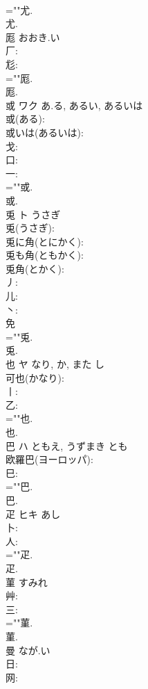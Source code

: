\documentclass[8pt]{extreport}
\begin{document}
\begin{CJK}{UTF8}{min}
\\	=""尤.
\\	尤.
\\	厖		おおき.い				
\\	厂: 
\\	尨: 
\\	=""厖.
\\	厖.
\\	或	ワク	あ.る, あるい, あるいは		
\\	或(ある): 
\\	或いは(あるいは): 
\\	戈: 
\\	口: 
\\	一: 
\\	=""或.
\\	或.
\\	兎	ト	うさぎ		
\\	兎(うさぎ): 
\\	兎に角(とにかく): 
\\	兎も角(ともかく): 
\\	兎角(とかく): 
\\	丿: 
\\	儿: 
\\	丶: 
\\	免 
\\	=""兎.
\\	兎.
\\	也	ヤ	なり, か, また	し	
\\	可也(かなり): 
\\	丨: 
\\	乙: 
\\	=""也.
\\	也.
\\	巴	ハ	ともえ, うずまき	とも	
\\	欧羅巴(ヨーロッパ): 
\\	巳: 
\\	=""巴.
\\	巴.
\\	疋	ヒキ	あし		
\\	卜: 
\\	人: 
\\	=""疋.
\\	疋.
\\	菫		すみれ				
\\	艸: 
\\	三: 
\\	=""菫.
\\	菫.
\\	曼		なが.い				
\\	日: 
\\	网: 

\end{CJK}
\end{document}
